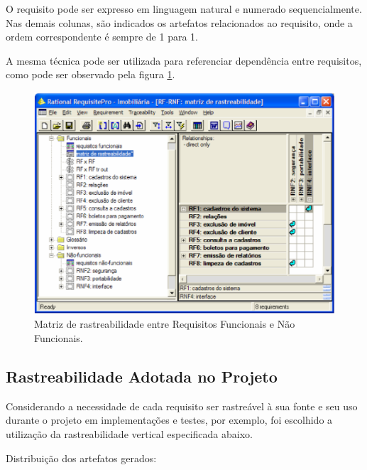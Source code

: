 O requisito pode ser expresso em linguagem natural e numerado sequencialmente. Nas demais colunas, são indicados os artefatos relacionados ao requisito, onde a ordem correspondente é sempre de 1 para 1.

A mesma técnica pode ser utilizada para referenciar dependência entre requisitos, como pode ser observado pela figura \ref{matrix_requirement}.

\begin{figure}[htb]
\centering
  \includegraphics[keepaspectratio=true,scale=0.7]
  {figuras/matriz_rastreabilidade2.eps}
  \caption{Matriz de  rastreabilidade  entre  Requisitos  Funcionais  e  Não Funcionais.}
  \label{matrix_requirement}
\end{figure}

\clearpage{}

\subsection{Rastreabilidade Adotada no Projeto}

Considerando a necessidade de cada requisito ser rastreável à sua fonte e seu uso durante o projeto em implementações e testes, por exemplo, foi escolhido a utilização da rastreabilidade vertical especificada abaixo.

Distribuição dos artefatos gerados:

